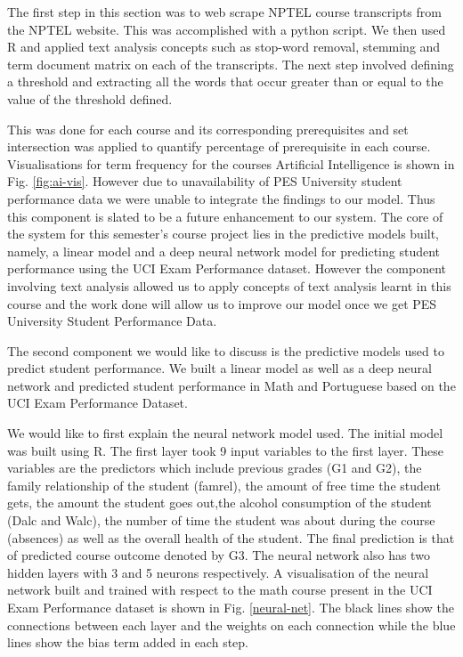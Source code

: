 \documentclass[conference]{IEEEtran}
\begin{document}
The first step in this section was to web scrape NPTEL course transcripts from the
NPTEL website. This was accomplished with a python script. We then used R and applied 
text analysis concepts such as stop-word removal, stemming and term document matrix 
on each of the transcripts. The next step involved defining a threshold and extracting 
all the words that occur greater than or equal to the value of the threshold defined.

This was done for each course and its corresponding prerequisites and set intersection
was applied to quantify percentage of prerequisite in each course. Visualisations for
term frequency for the courses Artificial Intelligence is shown in Fig. \ref{fig:ai-vis}.
However due to unavailability of PES University student performance data we were
unable to integrate the findings to our model. Thus this component is slated to be a future
enhancement to our system. The core of the system for this semester’s course project
lies in the predictive models built, namely, a linear model and a deep neural network
model for predicting student performance using the UCI Exam Performance dataset.
However the component involving text analysis allowed us to apply concepts of text
analysis learnt in this course and the work done will allow us to improve our model once
we get PES University Student Performance Data.

The second component we would like to discuss is the predictive models used to predict
student performance. We built a linear model as well as a deep neural network and
predicted student performance in Math and Portuguese based on the UCI Exam
Performance Dataset\cite{Lichman:2013}\cite{ref:4}.

We would like to first explain the neural network model used. The initial model was built
using R. The first layer took 9 input variables to the first layer. These variables are the
predictors which include previous grades (G1 and G2), the family relationship of the
student (famrel), the amount of free time the student gets, the amount the student goes
out,the alcohol consumption of the student (Dalc and Walc), the number of time the
student was about during the course (absences) as well as the overall health of the
student. The final prediction is that of predicted course outcome denoted by G3.
The neural network also has two hidden layers with 3 and 5 neurons respectively. A
visualisation of the neural network built and trained with respect to the math course
present in the UCI Exam Performance dataset is shown in Fig. \ref{neural-net}.
The black lines show the connections between each layer and the weights on each
connection while the blue lines show the bias term added in each step.
\end{document}
